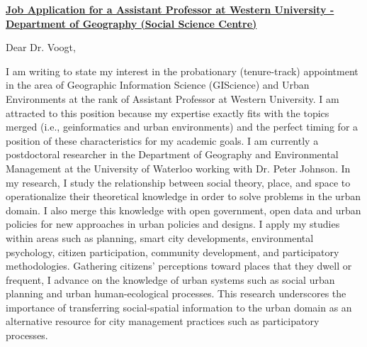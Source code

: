 \textbf{\underline{Job Application for a Assistant Professor at Western University - Department of Geography (Social Science Centre)}}



Dear Dr. Voogt,

I am writing to state my interest in the probationary (tenure-track) appointment in the area of Geographic Information Science (GIScience) and Urban Environments at the rank of Assistant Professor at Western University. I am attracted to this position because my expertise exactly fits with the topics merged (i.e., geinformatics and urban environments) and the perfect timing for a position of these characteristics for my academic goals. I am currently a postdoctoral researcher in the Department of Geography and Environmental Management at the University of Waterloo working with Dr. Peter Johnson. In my research, I study the relationship between social theory, place, and space to operationalize their theoretical knowledge in order to solve problems in the urban domain. I also merge this knowledge with open government, open data and urban policies for new approaches in urban policies and designs. I apply my studies within areas such as planning, smart city developments, environmental psychology, citizen participation, community development, and participatory methodologies. Gathering citizens’ perceptions toward places that they dwell or frequent, I advance on the knowledge of urban systems such as social urban planning and urban human-ecological processes. This research underscores the importance of transferring social-spatial information to the urban domain as an alternative resource for city management practices such as participatory processes.\par


